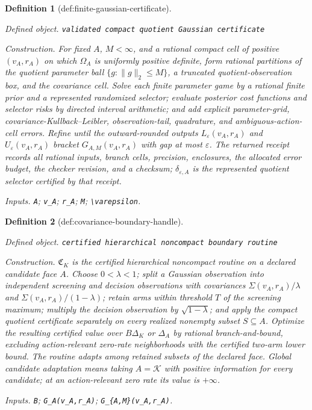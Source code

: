 \documentclass{article}
\newtheorem{definition}{Definition}
\begin{document}
\begin{definition}[def:finite-gaussian-certificate]\label{def:finite-gaussian-certificate}
\par\smallskip\noindent\emph{Defined object.} \texttt{validated compact quotient Gaussian certificate}
\par\smallskip\noindent\emph{Construction.} For fixed \(A\), \(M<\infty\), and a rational compact cell of positive \((v_A,r_A)\) on which \(\Omega_A\) is uniformly positive definite, form rational partitions of the quotient parameter ball \(\{g:\lVert g\rVert_2\leq M\}\), a truncated quotient-observation box, and the covariance cell.  Solve each finite parameter game by a rational finite prior and a represented randomized selector; evaluate posterior cost functions and selector risks by directed interval arithmetic; and add explicit parameter-grid, covariance-Kullback--Leibler, observation-tail, quadrature, and ambiguous-action-cell errors.  Refine until the outward-rounded outputs \(L_\varepsilon(v_A,r_A)\) and \(U_\varepsilon(v_A,r_A)\) bracket \(G_{A,M}(v_A,r_A)\) with gap at most \(\varepsilon\).  The returned receipt records all rational inputs, branch cells, precision, enclosures, the allocated error budget, the checker revision, and a checksum; \(\delta_{\varepsilon,A}\) is the represented quotient selector certified by that receipt.
\par\smallskip\noindent\emph{Inputs.} \texttt{A}; \texttt{v\_\allowbreak{}A}; \texttt{r\_\allowbreak{}A}; \texttt{M}; \texttt{\textbackslash{}\allowbreak{}varepsilon}.
\end{definition}

\begin{definition}[def:covariance-boundary-handle]\label{def:covariance-boundary-handle}
\par\smallskip\noindent\emph{Defined object.} \texttt{certified hierarchical noncompact boundary routine}
\par\smallskip\noindent\emph{Construction.} \(\mathfrak C_K\) is the certified hierarchical noncompact routine on a declared candidate face \(A\).  Choose \(0<\lambda<1\); split a Gaussian observation into independent screening and decision observations with covariances \(\Sigma(v_A,r_A)/\lambda\) and \(\Sigma(v_A,r_A)/(1-\lambda)\); retain arms within threshold \(T\) of the screening maximum; multiply the decision observation by \(\sqrt{1-\lambda}\); and apply the compact quotient certificate separately on every realized nonempty subset \(S\subseteq A\).  Optimize the resulting certified value over \(B\Delta_K\) or \(\Delta_A\) by rational branch-and-bound, excluding action-relevant zero-rate neighborhoods with the certified two-arm lower bound.  The routine adapts among retained subsets of the declared face.  Global candidate adaptation means taking \(A=\mathcal K\) with positive information for every candidate; at an action-relevant zero rate its value is \(+\infty\).
\par\smallskip\noindent\emph{Inputs.} \texttt{B}; \texttt{G\_\allowbreak{}A(v\_\allowbreak{}A,\allowbreak{}r\_\allowbreak{}A)}; \texttt{G\_\allowbreak{}\{A,\allowbreak{}M\}\allowbreak{}(v\_\allowbreak{}A,\allowbreak{}r\_\allowbreak{}A)}.
\end{definition}
\end{document}
